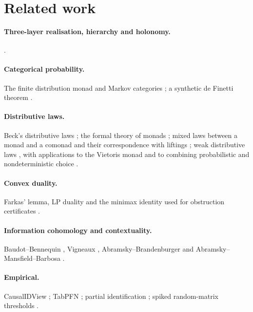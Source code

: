 \documentclass[11pt]{article}
\theoremstyle{definition}
\theoremstyle{remark}
\begin{document}
\section{Related work}

\paragraph{Three-layer realisation, hierarchy and holonomy.}
\cite{Awasthi-ThreeLayers,Awasthi-Hierarchy,Awasthi-Holonomy}.
\paragraph{Categorical probability.} The finite distribution monad and Markov categories
\cite{Fritz2020,FGPR2023}; a synthetic de Finetti theorem \cite{FGP2021}.
\paragraph{Distributive laws.} Beck's distributive laws \cite{Beck1969}; the formal theory of monads
\cite{Street1972}; mixed laws between a monad and a comonad and their correspondence with liftings
\cite{PowerWatanabe2002}; weak distributive
laws \cite{Street2009,Bohm2010,BohmLackStreet2011}, with applications to the Vietoris monad
\cite{Garner2020} and to combining probabilistic and nondeterministic choice \cite{GoyPetrisan2020}.
\paragraph{Convex duality.} Farkas' lemma, LP duality and the minimax identity used for
obstruction certificates \cite{Schrijver1986}.
\paragraph{Information cohomology and contextuality.} Baudot--Bennequin \cite{BaudotBennequin2015},
Vigneaux \cite{Vigneaux2019}, Abramsky--Brandenburger \cite{AbramskyBrandenburger2011} and
Abramsky--Mansfield--Barbosa \cite{AbramskyMansfieldBarbosa2012}.
\paragraph{Empirical.} CausalIDView \cite{Awasthi-CausalIDView}; TabPFN \cite{Hollmann2023}; partial
identification \cite{Manski1990}; spiked random-matrix thresholds \cite{BBP2005}.
\end{document}
